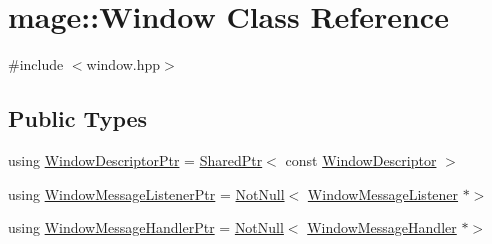 \hypertarget{classmage_1_1_window}{}\section{mage\+:\+:Window Class Reference}
\label{classmage_1_1_window}


{\ttfamily \#include $<$window.\+hpp$>$}

\subsection*{Public Types}
\begin{DoxyCompactItemize}
\item 
using \mbox{\hyperlink{classmage_1_1_window_ac41b052d8e8dd0571b3ec862e8f6da05}{Window\+Descriptor\+Ptr}} = \mbox{\hyperlink{namespacemage_a1e01ae66713838a7a67d30e44c67703e}{Shared\+Ptr}}$<$ const \mbox{\hyperlink{classmage_1_1_window_descriptor}{Window\+Descriptor}} $>$
\item 
using \mbox{\hyperlink{classmage_1_1_window_a0e0a4f2a3f6db176f6aec454b94a06fb}{Window\+Message\+Listener\+Ptr}} = \mbox{\hyperlink{namespacemage_a8769f9d670d6b585ea306cb1062af94b}{Not\+Null}}$<$ \mbox{\hyperlink{classmage_1_1_window_message_listener}{Window\+Message\+Listener}} $\ast$$>$
\item 
using \mbox{\hyperlink{classmage_1_1_window_add1d792fb9f71e70d4fb07409d80cfdd}{Window\+Message\+Handler\+Ptr}} = \mbox{\hyperlink{namespacemage_a8769f9d670d6b585ea306cb1062af94b}{Not\+Null}}$<$ \mbox{\hyperlink{classmage_1_1_window_message_handler}{Window\+Message\+Handler}} $\ast$$>$
\end{DoxyCompactItemize}

